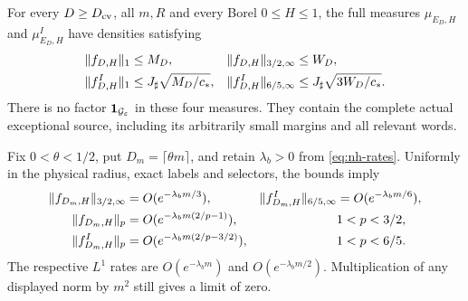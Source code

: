 \begin{theorem}
\label{thm:fr-deep-source}
For every $D\ge D_{\rm cv}$, all $m,R$ and every Borel
$0\le H\le1$, the full measures $\mu_{E_D,H}$ and
$\mu^I_{E_D,H}$ have densities satisfying
\begin{align}\label{eq:fr-deep-norms}
 \|f_{D,H}\|_1&\le M_D,&
 \|f_{D,H}\|_{3/2,\infty}&\le W_D,\notag\\
 \|f^I_{D,H}\|_1&\le J_\sharp\sqrt{M_D/c_*},&
 \|f^I_{D,H}\|_{6/5,\infty}&\le J_\sharp\sqrt{3W_D/c_*}.
\end{align}
There is no factor $\mathbf1_{\mathcal G_\varepsilon}$ in these
four measures.  They contain the complete actual exceptional source,
including its arbitrarily small margins and all relevant words.

Fix $0<\theta<1/2$, put $D_m=\lceil\theta m\rceil$, and retain
$\lambda_b>0$ from \eqref{eq:nh-rates}.  Uniformly in the physical
radius, exact labels and selectors, the bounds imply
\begin{align}\label{eq:fr-deep-rates}
 \|f_{D_m,H}\|_{3/2,\infty}
                   &=O(e^{-\lambda_bm/3}),&
 \|f^I_{D_m,H}\|_{6/5,\infty}
                   &=O(e^{-\lambda_bm/6}),\notag\\
 \|f_{D_m,H}\|_p
                   &=O(e^{-\lambda_bm(2/p-1)}),
                         &&1<p<3/2,\notag\\
 \|f^I_{D_m,H}\|_p
                   &=O(e^{-\lambda_bm(2/p-3/2)}),
                         &&1<p<6/5.
\end{align}
The respective $L^1$ rates are $O(e^{-\lambda_bm})$ and
$O(e^{-\lambda_bm/2})$.  Multiplication of any displayed norm by
$m^2$ still gives a limit of zero.
\end{theorem}

